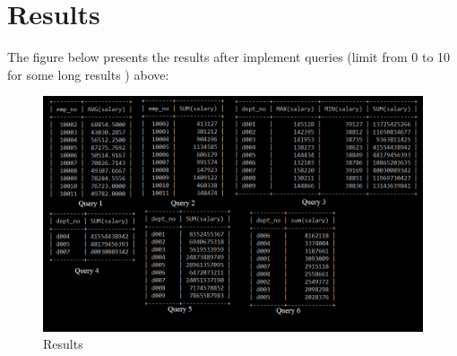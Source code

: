 \documentclass{article}
\begin{document}
\section*{Results}

The figure below presents the results after implement queries (limit from 0 to 10 for some long results
) above:\\
\begin{figure}
\includegraphics[scale = 0.65]{result.PNG}
\caption{Results}
\end{figure}
\end{document}
